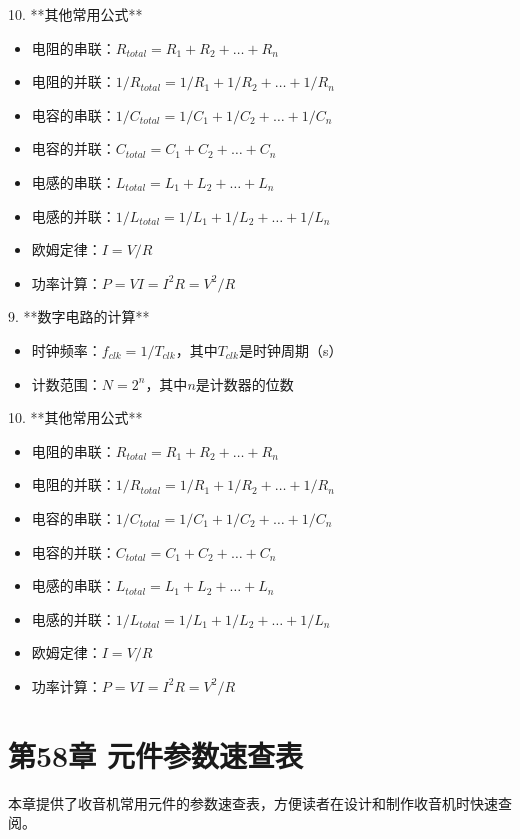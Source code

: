 \documentclass[12pt,UTF8]{ctexbook}
\begin{document}
10. **其他常用公式**
   \begin{itemize}
     \item 电阻的串联：$R_{total} = R_1 + R_2 + \ldots + R_n$
     \item 电阻的并联：$1/R_{total} = 1/R_1 + 1/R_2 + \ldots + 1/R_n$
     \item 电容的串联：$1/C_{total} = 1/C_1 + 1/C_2 + \ldots + 1/C_n$
     \item 电容的并联：$C_{total} = C_1 + C_2 + \ldots + C_n$
     \item 电感的串联：$L_{total} = L_1 + L_2 + \ldots + L_n$
     \item 电感的并联：$1/L_{total} = 1/L_1 + 1/L_2 + \ldots + 1/L_n$
     \item 欧姆定律：$I = V/R$
     \item 功率计算：$P = VI = I^2R = V^2/R$
   \end{itemize}

9. **数字电路的计算**
   \begin{itemize}
     \item 时钟频率：$f_{clk} = 1/T_{clk}$，其中$T_{clk}$是时钟周期（s）
     \item 计数范围：$N = 2^n$，其中$n$是计数器的位数
   \end{itemize}

10. **其他常用公式**
   \begin{itemize}
     \item 电阻的串联：$R_{total} = R_1 + R_2 + \ldots + R_n$
     \item 电阻的并联：$1/R_{total} = 1/R_1 + 1/R_2 + \ldots + 1/R_n$
     \item 电容的串联：$1/C_{total} = 1/C_1 + 1/C_2 + \ldots + 1/C_n$
     \item 电容的并联：$C_{total} = C_1 + C_2 + \ldots + C_n$
     \item 电感的串联：$L_{total} = L_1 + L_2 + \ldots + L_n$
     \item 电感的并联：$1/L_{total} = 1/L_1 + 1/L_2 + \ldots + 1/L_n$
     \item 欧姆定律：$I = V/R$
     \item 功率计算：$P = VI = I^2R = V^2/R$
   \end{itemize}

\chapter*{第58章 元件参数速查表}

本章提供了收音机常用元件的参数速查表，方便读者在设计和制作收音机时快速查阅。
\end{document}
